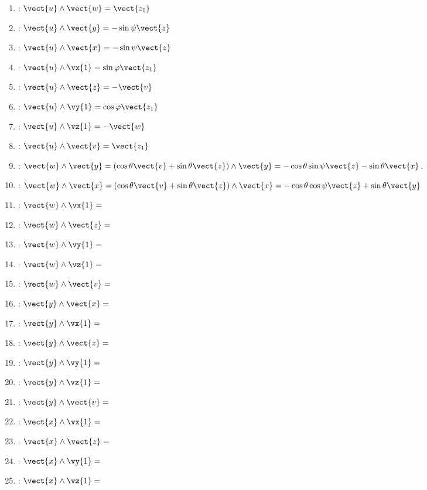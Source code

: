 \begin{corrigebox}
\begin{enumerate}
\item : $\vect{u}\wedge\vect{w} = \vect{z_1}$
\item : $\vect{u}\wedge\vect{y} = -\sin\psi \vect{z}$
\item : $\vect{u}\wedge\vect{x} = -\sin\psi \vect{z}$
\item : $\vect{u}\wedge\vx{1} = \sin\varphi \vect{z_1}$
\item : $\vect{u}\wedge\vect{z} = -\vect{v}$
\item : $\vect{u}\wedge\vy{1} =  \cos\varphi \vect{z_1}$
\item : $\vect{u}\wedge\vz{1} = -\vect{w}$
\item : $\vect{u}\wedge\vect{v} = \vect{z_1}$
\item : $\vect{w}\wedge\vect{y} = \left( \cos\theta \vect{v}+\sin\theta \vect{z}\right)\wedge\vect{y} = -\cos\theta  \sin \psi \vect{z}-\sin\theta \vect{x}$.
\item : $\vect{w}\wedge\vect{x} =\left( \cos\theta \vect{v}+\sin\theta \vect{z}\right)\wedge\vect{x} = -\cos\theta\cos\psi \vect{z}+\sin\theta \vect{y}$
\item : $\vect{w}\wedge\vx{1} = $
\item : $\vect{w}\wedge\vect{z} = $
\item : $\vect{w}\wedge\vy{1} = $
\item : $\vect{w}\wedge\vz{1} = $
\item : $\vect{w}\wedge\vect{v} = $
\item : $\vect{y}\wedge\vect{x} = $
\item : $\vect{y}\wedge\vx{1} = $
\item : $\vect{y}\wedge\vect{z} = $
\item : $\vect{y}\wedge\vy{1} = $
\item : $\vect{y}\wedge\vz{1} = $
\item : $\vect{y}\wedge\vect{v} = $
\item : $\vect{x}\wedge\vx{1} = $
\item : $\vect{x}\wedge\vect{z} = $
\item : $\vect{x}\wedge\vy{1} = $
\item : $\vect{x}\wedge\vz{1} = $

\end{enumerate}
\end{corrigebox}
